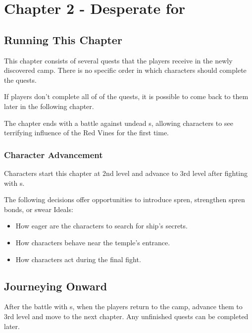 \chapter{Chapter 2 - Desperate for \medicalHerb{}}

\setcounter{section}{-1}
\section{Running This Chapter}

This chapter consists of several quests that the players receive in the newly discovered camp. There is no specific order in which characters should complete the quests. 

If players don't complete all of of the quests, it is possible to come back to them later in the following chapter.

The chapter ends with a battle against undead \enemyReanimatedAxehound{}s, allowing characters to see terrifying influence of the Red Vines for the first time.

\subsection{Character Advancement}

Characters start this chapter at 2nd level and advance to 3rd level after fighting with \enemyReanimatedAxehound{}s.

The following decisions offer opportunities to introduce spren, strengthen spren bonds, or swear Ideals:
\begin{itemize}
	\item How eager are the characters to search for ship's secrets.
	\item How characters behave near the temple's entrance.
	\item How characters act during the final fight.
\end{itemize}









\section{Journeying Onward}

After the battle with \enemyReanimatedAxehound{}s, when the players return to the camp, advance them to 3rd level and move to the next chapter. Any unfinished quests can be completed later.